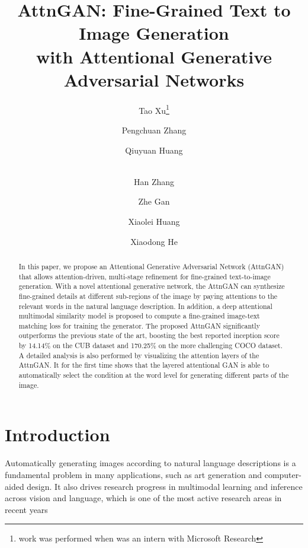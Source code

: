 \documentclass[10pt,twocolumn,letterpaper]{article}
\begin{document}
\title{AttnGAN: Fine-Grained Text to Image Generation \\with Attentional Generative Adversarial Networks}


\author[1]{Tao Xu\thanks{ work was performed when was an intern with Microsoft Research}} 
\author[2]{\;Pengchuan Zhang} 
\author[2]{\;Qiuyuan Huang} 
\author[3]{\\Han Zhang}
\author[4]{\;Zhe Gan}
\author[1]{\;Xiaolei Huang}
\author[2]{\;Xiaodong He}

\renewcommand\Authands{, } 

\maketitle


\begin{abstract}
In this paper, we propose an Attentional Generative Adversarial Network (AttnGAN) that allows attention-driven, multi-stage refinement for fine-grained text-to-image generation.  With a novel attentional generative network, the AttnGAN can synthesize fine-grained details at different sub-regions of the image by paying attentions to the relevant words in the natural language description. In addition, a deep attentional multimodal similarity model is proposed to compute a fine-grained image-text matching loss for training the generator. The proposed AttnGAN significantly outperforms the previous state of the art, boosting the best reported inception score by 14.14\% on the CUB dataset and 170.25\% on the more challenging COCO dataset. A detailed analysis is also performed by visualizing the attention layers of the AttnGAN. It for the first time shows that the layered attentional GAN is able to automatically select the condition at the word level for generating different parts of the image. 
\end{abstract}




\vspace{-5pt}
\section{Introduction}
\vspace{-5pt}
Automatically generating images according to natural language descriptions is a fundamental problem in many applications, such as art generation and computer-aided design. It also drives research progress in multimodal learning and inference across vision and language, which is one of the most active research areas in recent years~\cite{reed2016generative,reed2016learning,Han16stackgan,reed2016cvpr,FangGISDDGHMPZZ15,XuBKCCSZB15,SCN_CVPR2017, AgrawalLAMZPB17,YangHGDS16}
\end{document}
